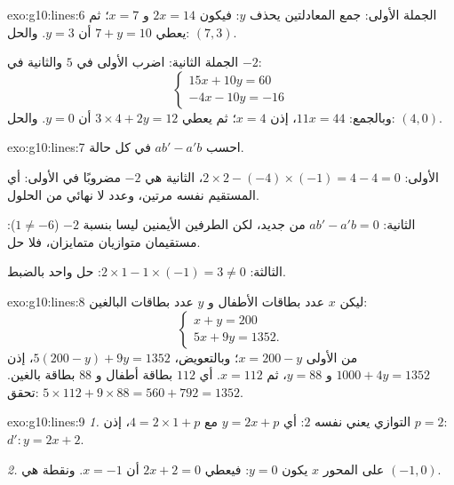 \begin{solution}{exo:g10:lines:6}
الجملة الأولى: جمع المعادلتين يحذف $y$: فيكون $2x = 14$ و $x = 7$؛
ثم يعطي $7 + y = 10$ أن $y = 3$. والحل: $(7, 3)$.

الجملة الثانية: اضرب  الأولى في $5$ والثانية في $-2$:
\[
\begin{cases}
15x + 10y = 60 \\
-4x - 10y = -16
\end{cases}
\]
وبالجمع: $11x = 44$، إذن $x = 4$؛ ثم يعطي $3 \times 4 + 2y = 12$
أن $y = 0$. والحل: $(4, 0)$.
\end{solution}

\begin{solution}{exo:g10:lines:7}
احسب $ab' - a'b$ في كل حالة.

الأولى: $2 \times 2 - (-4) \times (-1) = 4 - 4 = 0$،  الثانية
هي $-2$ مضروبًا في الأولى: أي المستقيم نفسه مرتين، وعدد لا نهائي من
الحلول.

الثانية: $ab' - a'b = 0$ من جديد، لكن الطرفين الأيمنين ليسا بنسبة
$-2$ ($1 \neq -6$): مستقيمان متوازيان متمايزان، فلا حل.

الثالثة: $2 \times 1 - 1 \times (-1) = 3 \neq 0$: حل واحد بالضبط.
\end{solution}

\begin{solution}{exo:g10:lines:8}
ليكن $x$ عدد بطاقات الأطفال و $y$ عدد بطاقات
البالغين:
\[
\begin{cases}
x + y = 200 \\
5x + 9y = 1352 .
\end{cases}
\]
من  الأولى $x = 200 - y$؛ وبالتعويض،
$5(200 - y) + 9y = 1352$، إذن $1000 + 4y = 1352$ و $y = 88$، ثم
$x = 112$. أي $112$ بطاقة أطفال و $88$ بطاقة بالغين. تحقق:
$5 \times 112 + 9 \times 88 = 560 + 792 = 1352$.
\end{solution}

\begin{solution}{exo:g10:lines:9}
\emph{1.} التوازي يعني  نفسه $2$: أي $y = 2x + p$ مع
$4 = 2 \times 1 + p$، إذن $p = 2$: $d'\colon y = 2x + 2$.

\emph{2.} على المحور $x$ يكون $y = 0$: فيعطي $2x + 2 = 0$ أن $x = -1$. ونقطة
 هي $(-1, 0)$.
\end{solution}

